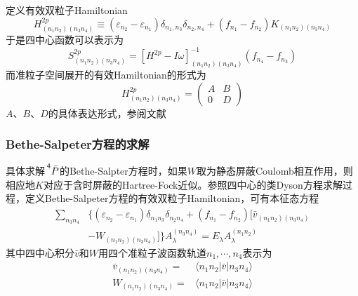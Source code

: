 {{{\begin{displaymath}
	\end{displaymath}
	定义有效双粒子\textrm{Hamiltonian}
	\begin{displaymath}
		H_{(n_1n_2)(n_3n_4)}^{2p}\equiv(\varepsilon_{n_2}-\varepsilon_{n_1})\delta_{n_1,n_3}\delta_{n_2,n_4}+(f_{n_1}-f_{n_2})K_{(n_1n_2)(n_3n_4)}
	\end{displaymath}
	于是四中心函数可以表示为
	\begin{displaymath}
		S_{(n_1n_2)(n_3n_4)}^{2p}=[H^{2p}-I\omega]_{(n_1n_2)(n_3n_4)}^{-1}(f_{n_4}-f_{n_3})
	\end{displaymath} 
	而准粒子空间展开的有效\textrm{Hamiltonian}的形式为
	\begin{displaymath}
		H_{(n_1n_2)(n_3n_4)}^{2p}=
		\begin{pmatrix}
			A &B\\
			0 &D
		\end{pmatrix}
	\end{displaymath}
	$A$、$B$、$D$的具体表达形式，参阅文献\cite{RMP74-601_2002}}}
}

\frame
{
	\frametitle{\textrm{Bethe-Salpeter}方程的求解}
	具体求解$\sideset{^4}{}{\mathop{\bar{P}}}$的\textrm{Bethe-Salpter}方程时，如果$W$取为静态屏蔽\textrm{Coulomb}相互作用，则相应地$K$对应于含时屏蔽的\textrm{Hartree-Fock}近似。参照四中心的类\textrm{Dyson}方程求解过程，定义\textrm{Bethe-Salpeter}方程的有效双粒子\textrm{Hamiltonian}，可有本征态方程
	\begin{displaymath}
		\begin{aligned}
			\sum_{n_3n_4}&\{(\varepsilon_{n_2}-\varepsilon_{n_1})\delta_{n_1n_3}\delta_{n_2n_4}+(f_{n_1}-f_{n_2})[\bar{v}_{(n_1n_2)(n_3n_4)}\\
			&-W_{(n_1n_2)(n_3n_4)}]\}A_{\lambda}^{(n_3n_4)}=E_{\lambda}A_{\lambda}^{(n_1n_2)}
		\end{aligned}
	\end{displaymath}
	其中四中心积分$\bar{v}$和$W$用四个准粒子波函数轨道$n_1,\cdots,n_4$表示为
	\begin{displaymath}
		\begin{aligned}
			\bar{v}_{(n_1n_2)(n_3n_4)}=&\langle n_1n_2|\bar{v}|n_3n_4\rangle\\	
			W_{(n_1n_2)(n_3n_4)}=&\langle n_1n_2|\bar{v}|n_3n_4\rangle\\	
		\end{aligned}
	\end{displaymath}
}

